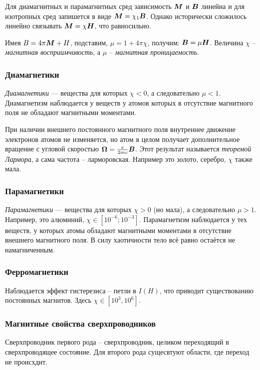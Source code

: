 Для диамагнитных и парамагнитных сред зависимость $\mbox{\boldmath $M$}$ и $\mbox{\boldmath $B$}$ линейна и для изотропных сред запишется в виде $\mbox{\boldmath $M$} = \chi_{1} \mbox{\boldmath $B$}$. Однако исторически сложилось линейно связывать $\mbox{\boldmath $M$} =\chi \mbox{\boldmath $H$}$, что равносильно.

Имея $B = 4 \pi \mbox{\boldmath $M$} + H$, подставим, $\mu= 1 + 4 \pi \chi$, получим:
$\mbox{\boldmath $B$} = \mu \mbox{\boldmath $H$}$.
Величина $\chi$ -- \textit{магнитная восприимчивость}, а $\mu$ -- \textit{магнитная проницаемость}.


\subsubsection*{Диамагнетики}
\textit{Диамагнетики} --- вещества для которых $\chi < 0$, а следовательно $\mu<1$.
Диамагнетизм наблюдается у веществ у атомов которых в отсутствие магнитного поля не обладают магнитными моментами. 

При наличии внешнего постоянного магнитного поля внутреннее движение электронов атомов не изменяется, но атом в целом получает дополнительное вращение с угловой скоростью $\mbox{\boldmath $\Omega$} = \frac{e}{2 m c} \mbox{\boldmath $B$}$.
Этот результат называется \textit{теоремой Лармора}, а сама частота -- ларморовская. Например это золото, серебро, $\chi$ также мала.


\subsubsection*{Парамагнетики}
\textit{Парамагнетики} --- вещества для которых $\chi > 0$ (но мала), а следовательно $\mu>1$. Например, это алюминий, $\chi \in [10^{-6};10^{-3}] $.
Парамагнетизм наблюдается у тех веществ, у которых атомы обладают магнитными моментами в отсутствие внешнего магнитного поля. В силу хаотичности тело всё равно остаётся не намагниченным.

\subsubsection*{Ферромагнетики}

Наблюдается эффект гистерезиса -- петли в $I(H)$, что приводит существованию постоянных магнитов. Здесь $\chi \in [10^{3}, 10^{6}]$. 


\subsubsection*{Магнитные свойства сверхпроводников}

Сверхпроводник первого рода -- сверхпроводник, целиком переходящий в сверхпроводящее состояние. Для второго рода сущесвтуют области, где переход не происхдит. 
 
